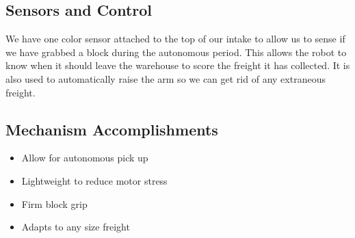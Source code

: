


\subsection*{Sensors and Control}
We have one color sensor attached to the top of our intake to allow us to sense if we have grabbed a block during the autonomous period. This allows the robot to know when it should leave the warehouse to score the freight it has collected. It is also used to automatically raise the arm so we can get rid of any extraneous freight. 

\subsection*{Mechanism Accomplishments}
\begin{itemize}
    \item Allow for autonomous pick up
    \item Lightweight to reduce motor stress
    \item Firm block grip 
    \item Adapts to any size freight
\end{itemize} 